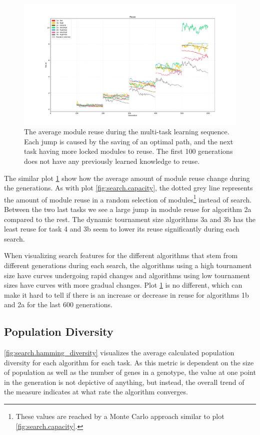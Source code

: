 \begin{figure}[p!]%
    \includegraphics[width=\textwidth]{Chapters/Experiments/search_algo/figures/Module_reuse_pr_generation.pdf}
    \caption{The average module reuse during the multi-task learning sequence. Each jump is caused by the saving of an optimal path, and the next task having more locked modules to reuse. The first 100 generations does not have any previously learned knowledge to reuse.}
    \label{fig:search.reuse}
\end{figure}

The similar plot \ref{fig:search.reuse} show how the average amount of module reuse change during the generations. As with plot \ref{fig:search.capacity}, the dotted grey line represents the amount of module reuse in a random selection of modules\footnote{These values are reached by a Monte Carlo approach similar to plot \ref{fig:search.capacity}.} instead of search. Between the two last tasks we see a large jump in module reuse for algorithm 2a compared to the rest. The dynamic tournament size algorithms 3a and 3b has the least reuse for task 4 and 3b seem to lower its reuse significantly during each search. 

When visualizing search features for the different algorithms that stem from different generations during each search, the algorithms using a high tournament size have curves undergoing rapid changes and algorithms using low tournament sizes have curves with more gradual changes. Plot \ref{fig:search.reuse} is no different, which can make it hard to tell if there is an increase or decrease in reuse for algorithms 1b and 2a for the last 600 generations. 

\subsection{Population Diversity}
\ref{fig:search.hamming_diversity} visualizes the average calculated population diversity for each algorithm for each task. As this metric is dependent on the size of population as well as the number of genes in a genotype, the value at one point in the generation is not depictive of anything, but instead, the overall trend of the measure indicates at what rate the algorithm converges. 

